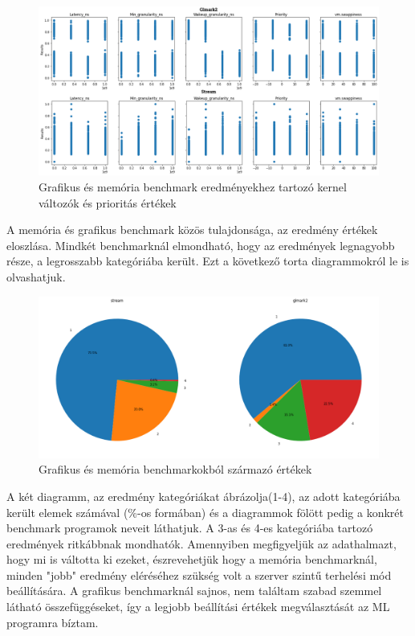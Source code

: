 \begin{figure}[h!]
\centering
\includegraphics[scale=0.35]{images/graphicsAndMemoryBenchmarkValue.png}
\caption{Grafikus és memória benchmark eredményekhez tartozó kernel változók és prioritás értékek}
\label{fig:GraphicsAndMemoryParameters}
\end{figure}

A memória és grafikus benchmark közös tulajdonsága, az eredmény értékek eloszlása. Mindkét benchmarknál elmondható, hogy az eredmények legnagyobb része, a legrosszabb kategóriába került.
Ezt a következő torta diagrammokról le is olvashatjuk.

\begin{figure}[h!]
\centering
\includegraphics[scale=0.3]{images/graphicsAndMemoryBenchmarkChart.png}
\caption{Grafikus és memória benchmarkokból származó értékek}
\label{fig:GraphicsAndMemoryChart}
\end{figure}

A két diagramm, az eredmény kategóriákat ábrázolja(1-4), az adott kategóriába került elemek számával (\%-os formában) és a diagrammok fölött pedig a konkrét benchmark programok neveit láthatjuk. A 3-as és 4-es kategóriába tartozó eredmények ritkábbnak mondhatók. Amennyiben megfigyeljük az adathalmazt, hogy mi is váltotta ki ezeket, észrevehetjük hogy a memória benchmarknál, minden "jobb" eredmény eléréséhez szükség volt a szerver szintű terhelési mód beállítására.
A grafikus benchmarknál sajnos, nem találtam szabad szemmel látható összefüggéseket, így a legjobb beállítási értékek megválasztását az ML programra bíztam.


